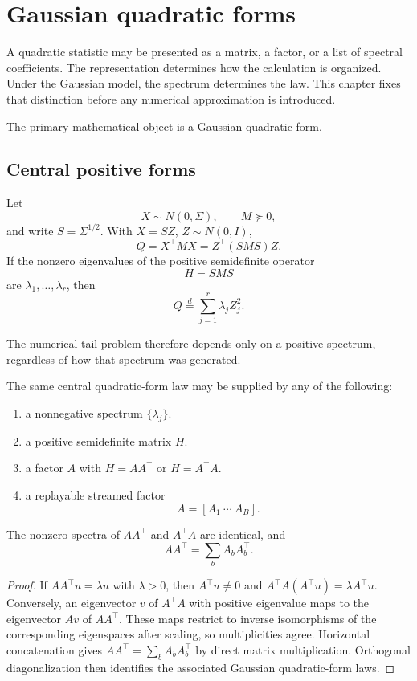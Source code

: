 \chapter{Gaussian quadratic forms}\label{ch:gaussian}
A quadratic statistic may be presented as a matrix, a factor, or a list of
spectral coefficients. The representation determines how the calculation is
organized. Under the Gaussian model, the spectrum determines the law.
This chapter fixes that distinction before any numerical approximation is
introduced.
\label{sec:gaussian-core}

The primary mathematical object is a Gaussian quadratic form.

\section{Central positive forms}

Let
\[
X\sim N(0,\Sigma),
\qquad
M\succeq0,
\]
and write \(S=\Sigma^{1/2}\).  With \(X=SZ\), \(Z\sim N(0,I)\),
\[
Q=X^\top MX
=
Z^\top(SMS)Z.
\]
If the nonzero eigenvalues of the positive semidefinite operator
\[
H=SMS
\]
are \(\lambda_1,\ldots,\lambda_r\), then
\[
\boxed{
Q\overset d=
\sum_{j=1}^r\lambda_jZ_j^2.
}
\]

The numerical tail problem therefore depends only on a positive spectrum,
regardless of how that spectrum was generated.

\begin{proposition}\label{claim:final-2-1}
The same central quadratic-form law may be supplied by any of the following:
\begin{enumerate}
\item a nonnegative spectrum \(\{\lambda_j\}\).
\item a positive semidefinite matrix \(H\).
\item a factor \(A\) with \(H=AA^\top\) or \(H=A^\top A\).
\item a replayable streamed factor
\[
A=[A_1\ \cdots\ A_B].
\]
\end{enumerate}
The nonzero spectra of \(AA^\top\) and \(A^\top A\) are identical, and
\[
AA^\top=\sum_bA_bA_b^\top.
\]
\end{proposition}

\begin{proof}
If $AA^\top u=\lambda u$ with $\lambda>0$, then $A^\top u\ne0$ and
$A^\top A(A^\top u)=\lambda A^\top u$. Conversely, an eigenvector
$v$ of $A^\top A$ with positive eigenvalue maps to the eigenvector $Av$
of $AA^\top$. These maps restrict to inverse isomorphisms of the
corresponding eigenspaces after scaling, so multiplicities agree.
Horizontal concatenation gives $AA^\top=\sum_b A_bA_b^\top$ by direct
matrix multiplication. Orthogonal diagonalization then identifies the
associated Gaussian quadratic-form laws.
\end{proof}

